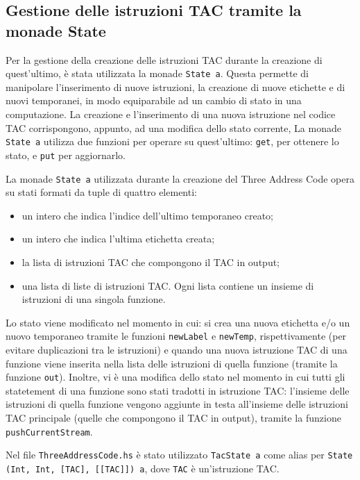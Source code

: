 \subsection{Gestione delle istruzioni TAC tramite la monade State}

Per la gestione della creazione delle istruzioni TAC durante la creazione di quest'ultimo, è stata utilizzata la monade {\tt State a}. Questa permette di manipolare l'inserimento di nuove istruzioni, la creazione di nuove etichette e di nuovi temporanei, in modo equiparabile ad un cambio di stato in una computazione. La creazione e l'inserimento di una nuova istruzione nel codice TAC corrispongono, appunto, ad una modifica dello stato corrente, La monade {\tt State a} utilizza due funzioni per operare su quest'ultimo: {\tt get}, per ottenere lo stato, e {\tt put} per aggiornarlo. 

La monade {\tt State a} utilizzata durante la creazione del Three Address Code opera su stati formati da tuple di quattro elementi:
\begin{itemize}
    \item un intero che indica l'indice dell'ultimo temporaneo creato;
    \item un intero che indica l'ultima etichetta creata;
    \item la lista di istruzioni TAC che compongono il TAC in output;
    \item una lista di liste di istruzioni TAC. Ogni lista contiene un insieme di istruzioni di una singola funzione. 
\end{itemize}

Lo stato viene modificato nel momento in cui: si crea una nuova etichetta e/o un nuovo temporaneo tramite le funzioni {\tt newLabel} e {\tt newTemp}, rispettivamente (per evitare duplicazioni tra le istruzioni) e quando una nuova istruzione TAC di una funzione viene inserita nella lista delle istruzioni di quella funzione (tramite la funzione {\tt out}). Inoltre, vi è una modifica dello stato nel momento in cui tutti gli statetement di una funzione sono stati tradotti in istruzione TAC: l'insieme delle istruzioni di quella funzione vengono aggiunte in testa all'insieme delle istruzioni TAC principale (quelle che compongono il TAC in output), tramite la funzione {\tt pushCurrentStream}.

Nel file {\tt ThreeAddressCode.hs} è stato utilizzato {\tt TacState a} come alias per {\tt State (Int, Int, [TAC], [[TAC]]) a}, dove {\tt TAC} è un'istruzione TAC.